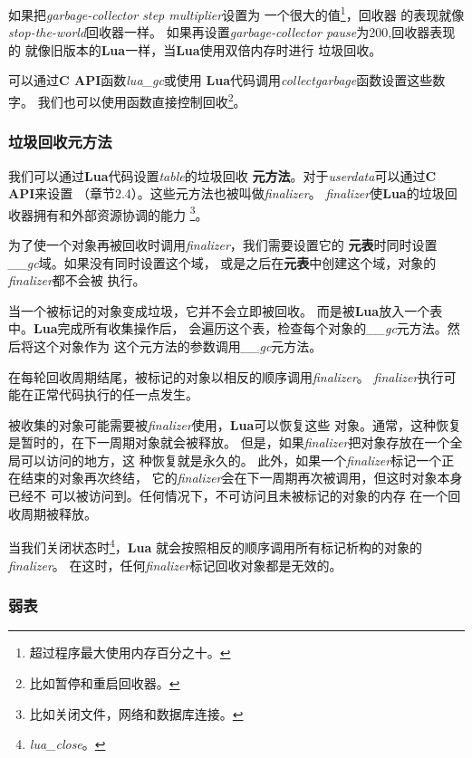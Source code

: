 \documentclass{ctexart}
\begin{document}
如果把\emph{garbage-collector step multiplier}设置为
一个很大的值\footnote{超过程序最大使用内存百分之十。}，回收器
的表现就像\emph{stop-the-world}回收器一样。
如果再设置\emph{garbage-collector pause}为200,回收器表现的
就像旧版本的\textbf{Lua}一样，当\textbf{Lua}使用双倍内存时进行
垃圾回收。

可以通过\textbf{C API}函数\emph{lua\_gc}或使用
\textbf{Lua}代码调用\emph{collectgarbage}函数设置这些数字。
我们也可以使用函数直接控制回收\footnote{比如暂停和重启回收器。}。

\subsubsection{垃圾回收元方法}

我们可以通过\textbf{Lua}代码设置\emph{table}的垃圾回收
\textbf{元方法}。对于\emph{userdata}可以通过\textbf{C API}来设置
（章节2.4）。这些元方法也被叫做\emph{finalizer}。
\emph{finalizer}使\textbf{Lua}的垃圾回收器拥有和外部资源协调的能力
\footnote{比如关闭文件，网络和数据库连接。}。

为了使一个对象再被回收时调用\emph{finalizer}，我们需要设置它的
\textbf{元表}时同时设置\emph{\_\_gc}域。如果没有同时设置这个域，
或是之后在\textbf{元表}中创建这个域，对象的\emph{finalizer}都不会被
执行。

当一个被标记的对象变成垃圾，它并不会立即被回收。
而是被\textbf{Lua}放入一个表中。\textbf{Lua}完成所有收集操作后，
会遍历这个表，检查每个对象的\emph{\_\_gc}元方法。然后将这个对象作为
这个元方法的参数调用\emph{\_\_gc}元方法。

在每轮回收周期结尾，被标记的对象以相反的顺序调用\emph{finalizer}。
\emph{finalizer}执行可能在正常代码执行的任一点发生。

被收集的对象可能需要被\emph{finalizer}使用，\textbf{Lua}可以恢复这些
对象。通常，这种恢复是暂时的，在下一周期对象就会被释放。
但是，如果\emph{finalizer}把对象存放在一个全局可以访问的地方，这
种恢复就是永久的。
此外，如果一个\emph{finalizer}标记一个正在结束的对象再次终结，
它的\emph{finalizer}会在下一周期再次被调用，但这时对象本身已经不
可以被访问到。任何情况下，不可访问且未被标记的对象的内存
在一个回收周期被释放。

当我们关闭状态时\footnote{\emph{lua\_close}。}，\textbf{Lua}
就会按照相反的顺序调用所有标记析构的对象的\emph{finalizer}。
在这时，任何\emph{finalizer}标记回收对象都是无效的。

\subsubsection{弱表}
\end{document}
